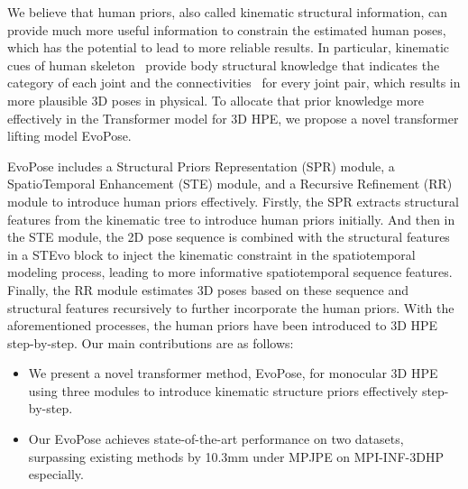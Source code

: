 \documentclass{article}
\begin{document}
We believe that human priors, also called kinematic structural information, can provide much more useful information to constrain the estimated human poses, which has the potential to lead to more reliable results. In particular, kinematic cues of human skeleton~\cite{kundu2020kinematic} provide body structural knowledge that indicates the category of each joint and the connectivities~\cite{kundu2020kinematic} for every joint pair, which results in more plausible 3D poses in physical. To allocate that prior knowledge more effectively in the Transformer model for 3D HPE, we propose a novel transformer lifting model EvoPose.

EvoPose includes a Structural Priors Representation (SPR) module, a SpatioTemporal Enhancement (STE) module, and a Recursive Refinement (RR) module to introduce human priors effectively. Firstly, the SPR extracts structural features from the kinematic tree to introduce human priors initially. And then in the STE module, the 2D pose sequence is combined with the structural features in a STEvo block to inject the kinematic constraint in the spatiotemporal modeling process, leading to more informative spatiotemporal sequence features. Finally, the RR module estimates 3D poses based on these sequence and structural features recursively to further incorporate the human priors. With the aforementioned processes, the human priors have been introduced to 3D HPE step-by-step. 
Our main contributions are as follows: 
\begin{itemize}[itemsep=0pt,topsep=0pt,parsep=0pt]
\item We present a novel transformer method, EvoPose, for monocular 3D HPE using three modules to introduce kinematic structure priors effectively step-by-step.\item Our EvoPose achieves state-of-the-art performance on two datasets, surpassing existing methods by 10.3mm under MPJPE on MPI-INF-3DHP especially.\end{itemize}
\end{document}
